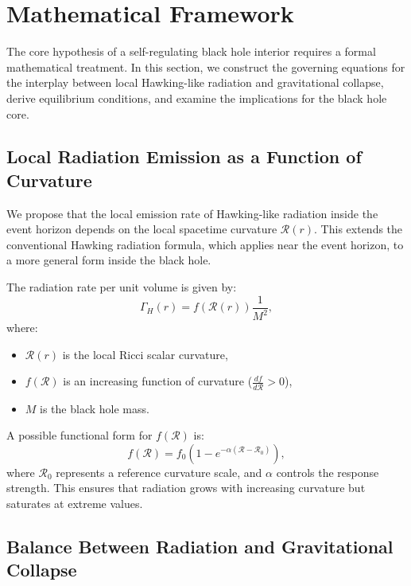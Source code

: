 \section{Mathematical Framework}
\label{sec:math_framework}

The core hypothesis of a self-regulating black hole interior requires a formal mathematical treatment. In this section, we construct the governing equations for the interplay between local Hawking-like radiation and gravitational collapse, derive equilibrium conditions, and examine the implications for the black hole core.

\subsection{Local Radiation Emission as a Function of Curvature}

We propose that the local emission rate of Hawking-like radiation inside the event horizon depends on the local spacetime curvature \( \mathcal{R}(r) \). This extends the conventional Hawking radiation formula, which applies near the event horizon, to a more general form inside the black hole.

The radiation rate per unit volume is given by:
\begin{equation}
    \Gamma_H(r) = f(\mathcal{R}(r)) \frac{1}{M^2},
\end{equation}
where:
\begin{itemize}
    \item \( \mathcal{R}(r) \) is the local Ricci scalar curvature,
    \item \( f(\mathcal{R}) \) is an increasing function of curvature (\( \frac{df}{d\mathcal{R}} > 0 \)),
    \item \( M \) is the black hole mass.
\end{itemize}

A possible functional form for \( f(\mathcal{R}) \) is:
\begin{equation}
    f(\mathcal{R}) = f_0 \left( 1 - e^{-\alpha (\mathcal{R} - \mathcal{R}_0)} \right),
\end{equation}
where \( \mathcal{R}_0 \) represents a reference curvature scale, and \( \alpha \) controls the response strength. This ensures that radiation grows with increasing curvature but saturates at extreme values.

\subsection{Balance Between Radiation and Gravitational Collapse}

